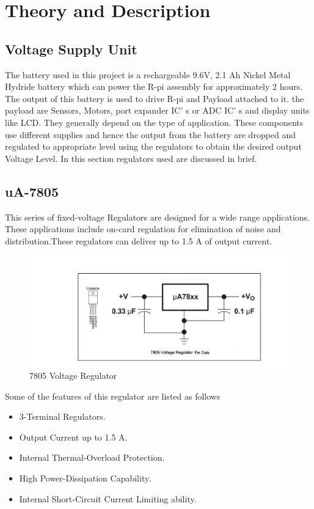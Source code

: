 \documentclass[11pt,a4paper]{article}
\begin{document}
	
	
	\section{Theory and Description}
	\subsection{Voltage Supply Unit}
	The battery used in this project is a rechargeable 9.6V, 2.1 Ah Nickel Metal Hydride battery which can power the R-pi assembly for approximately 2 hours. The output of this battery is used to drive R-pi and Payload attached to it. the payload are Sensors, Motors, port expander IC' s  or ADC IC' s and display units like LCD. They generally depend on the type of application. These components use different supplies and hence the output from the battery are dropped and regulated to appropriate level using the regulators to obtain the desired output Voltage Level. In this section regulators used are discussed in brief.    	
	
	\subsection{uA-7805}    
	This series of fixed-voltage Regulators are designed for a wide range applications. These applications include on-card regulation for elimination of noise and distribution.These regulators can deliver up to 1.5 A of output current.
	
	    \begin{figure}[h!]
	    	
	    	\includegraphics[scale=0.4]{7805.jpg}
			\caption{7805 Voltage Regulator}
	    \end{figure}
	
	Some of the features of this regulator are listed as follows
	\begin{itemize}
		\item 3-Terminal Regulators.
		\item Output Current up to 1.5 A.
		\item Internal Thermal-Overload Protection.
		\item High Power-Dissipation Capability.
		\item Internal Short-Circuit Current Limiting ability.
		
	\end{itemize} 
\end{document}
